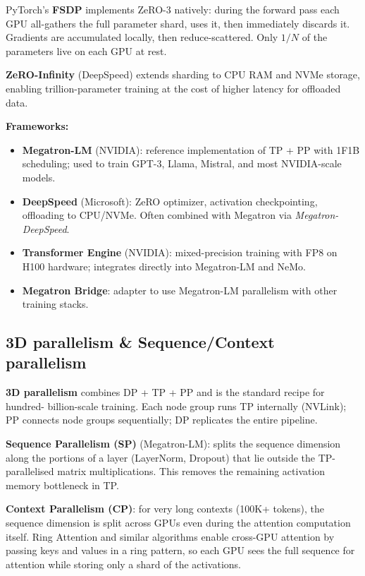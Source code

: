 PyTorch's \textbf{FSDP} implements ZeRO-3 natively: during the forward pass each GPU
all-gathers the full parameter shard, uses it, then immediately discards it. Gradients
are accumulated locally, then reduce-scattered. Only $1/N$ of the parameters live on
each GPU at rest.

\textbf{ZeRO-Infinity} (DeepSpeed) extends sharding to CPU RAM and NVMe storage,
enabling trillion-parameter training at the cost of higher latency for offloaded data.

\textbf{Frameworks:}
\begin{itemize}
  \item \textbf{Megatron-LM} (NVIDIA): reference implementation of TP + PP with
    1F1B scheduling; used to train GPT-3, Llama, Mistral, and most NVIDIA-scale models.
  \item \textbf{DeepSpeed} (Microsoft): ZeRO optimizer, activation checkpointing,
    offloading to CPU/NVMe. Often combined with Megatron via \emph{Megatron-DeepSpeed}.
  \item \textbf{Transformer Engine} (NVIDIA): mixed-precision training with FP8 on H100
    hardware; integrates directly into Megatron-LM and NeMo.
  \item \textbf{Megatron Bridge}: adapter to use Megatron-LM parallelism with other
    training stacks.
\end{itemize}

\subsection{3D parallelism \& Sequence/Context parallelism}

\textbf{3D parallelism} combines DP + TP + PP and is the standard recipe for hundred-
billion-scale training. Each node group runs TP internally (NVLink); PP connects node
groups sequentially; DP replicates the entire pipeline.

\textbf{Sequence Parallelism (SP)} (Megatron-LM): splits the sequence dimension along
the portions of a layer (LayerNorm, Dropout) that lie outside the TP-parallelised
matrix multiplications. This removes the remaining activation memory bottleneck in TP.

\textbf{Context Parallelism (CP)}: for very long contexts (100K+ tokens), the sequence
dimension is split across GPUs even during the attention computation itself. Ring
Attention and similar algorithms enable cross-GPU attention by passing keys and values
in a ring pattern, so each GPU sees the full sequence for attention while storing only
a shard of the activations.

